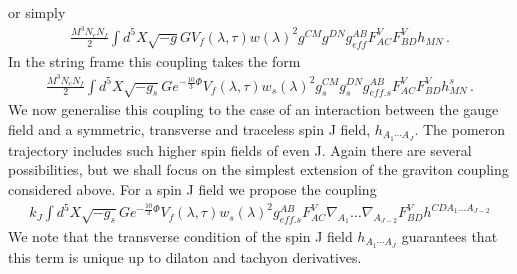 \documentclass[a4paper,12pt]{article}
\begin{document}
or simply
\begin{align}
\frac{M^3 N_c N_f}{2} \int d^5 X \sqrt{-g} G V_{f} \left(\lambda, \tau \right)  {w\left(\lambda\right)}^2 g^{C M} g^{D N} g_{eff}^{AB} F^V_{A C} F^V_{B D} h_{M N} \, .
\end{align}
In the string frame this coupling takes the form
\begin{align}
\frac{M^3 N_c N_f}{2} \int d^5 X \sqrt{-g_{s}} G e^{-\frac{10}{3}\Phi} V_{f} \left(\lambda, \tau \right)  {w_s\left(\lambda\right)}^2 g^{C M}_s g^{D N}_s g_{eff. s}^{AB} F^V_{A C} F^V_{B D} h_{M N}^s \, .
\end{align}
We now generalise this coupling to the case of an interaction between the gauge field and a symmetric, transverse and traceless spin J field, $h_{A_1 \cdots A_J}$. The pomeron trajectory includes such higher spin fields of even J. Again there are several possibilities, but we shall focus on the simplest extension of the graviton coupling considered above.
For a spin J field we propose the coupling
\begin{align}
k_J \int d^5X \sqrt{-g_s} G e^{-\frac{10}{3} \Phi} V_f \left( \lambda, \tau \right) {w_s\left(\lambda \right)}^2  g_{eff. s}^{AB} F^V_{A C} \nabla_{A_1} \dots \nabla_{A_{J-2}} F^V_{B D} h^{C D A_1 \dots A_{J-2}}
\label{eq:spin_J_graviton_coupling}
\end{align}
We note that the transverse condition of the spin J field $h_{A_1 \cdots A_J}$ guarantees that this term is unique up to dilaton and tachyon derivatives.
\end{document}
